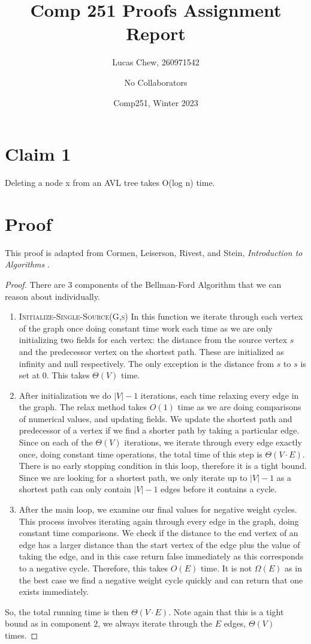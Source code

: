 \documentclass[12pt]{article}
\title{Comp 251 Proofs Assignment Report}
\author{Lucas Chew, 260971542 \and No Collaborators }
\date{Comp251, Winter 2023}
\begin{document}
\maketitle

\section*{Claim 1}
Deleting a node x from an AVL tree takes O(log n) time.

\section*{Proof}
This proof is adapted from Cormen, Leiserson, Rivest, and Stein, \textit{Introduction to Algorithms} \cite{cormen2009introduction}.
\begin{proof}
There are $3$ components of the Bellman-Ford Algorithm that we can reason about individually.
\begin{enumerate}
    \item \textsc{Initialize-Single-Source(G,s)}
    In this function we iterate through each vertex of the graph once doing constant time work each time as we are only initializing two fields for each vertex: the distance from the source vertex $s$ and the predecessor vertex on the shortest path. These are initialized as infinity and null respectively. The only exception is the distance from $s$ to $s$ is set at $0$. This takes $\Theta(V)$ time. 
    \item After initialization we do $|V|-1$ iterations, each time relaxing every edge in the graph. The relax method takes $O(1)$ time as we are doing comparisons of numerical values, and updating fields. We update the shortest path and predecessor of a vertex if we find a shorter path by taking a particular edge. Since on each of the $\Theta(V)$ iterations, we iterate through every edge exactly once, doing constant time operations, the total time of this step is $\Theta(V \cdot E)$. There is no early stopping condition in this loop, therefore it is a tight bound.  Since we are looking for a shortest path, we only iterate up to $|V|-1$ as a shortest path can only contain $|V|-1$ edges before it contains a cycle.
    \item After the main loop, we examine our final values for negative weight cycles. This process involves iterating again through every edge in the graph, doing constant time comparisons. We check if the distance to the end vertex of an edge has a larger distance than the start vertex of the edge plus the value of taking the edge, and in this case return false immediately as this corresponds to a negative cycle. Therefore, this takes $O(E)$ time. It is not $\Omega(E)$ as in the best case we find a negative weight cycle quickly and can return that one exists immediately. 
\end{enumerate}
So, the total running time is then $\Theta(V \cdot E)$. Note again that this is a tight bound as in component $2$, we always iterate through the $E$ edges, $\Theta(V)$ times.

\end{proof}
\end{document}

